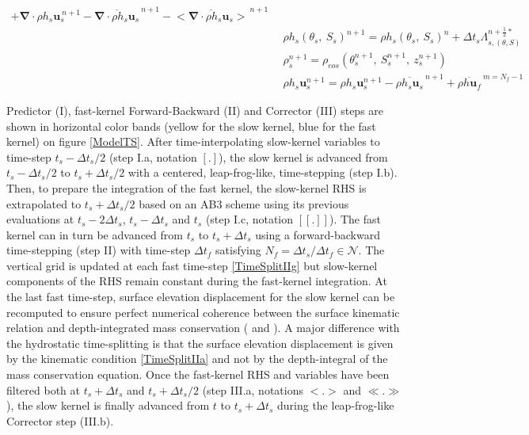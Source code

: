 \begin{table}
\begin{subequations}
\begin{alignat}{3}
 +\mathbf{\nabla}\cdot\rho h_s \mathbf{u}_s^{\ n+1}
 -\overline{\mathbf{\nabla}\cdot\rho h_s \mathbf{u}_s}^{\ n+1}
 -\overline{<\mathbf{\nabla}\cdot\rho h_s \mathbf{u}_s>}^{\ n+1}\\[2mm]
 \label{TimeSplitIIIb3}
 &\enspace\rho h_s(\theta_s,\ S_s)^{n+1}=
 \rho h_s(\theta_s,\ S_s)^{n}
 +\Delta t_s\Lambda_{s,(\theta,S)}^{n+\frac{1}{2}*}\\[0mm]
 \label{TimeSplitIIIb4}
 &\enspace\rho_s^{n+1}=\rho_{eos}\left(\theta_s^{n+1},\ S_s^{n+1},\ z_s^{n+1}\right)\\[0mm]
 \label{TimeSplitIIIb5}
 &\enspace\rho h_s\mathbf{u}_s^{n+1}=\rho h_s\mathbf{u}_s^{n+1}
 -\overline{\rho h_s\mathbf{u}_s}^{\ n+1}
 +\overline{\rho h\mathbf{u}_f}^{\ m=N_f-1}
\end{alignat}
\end{subequations}
\end{table}
Predictor (I), fast-kernel Forward-Backward (II) and Corrector (III) steps are shown in horizontal color bands (yellow for the slow kernel, blue for the fast kernel) on figure \ref{ModelTS}. After time-interpolating slow-kernel variables to time-step $t_s-\Delta t_s/2$ (step I.a, notation $[.]$), the slow kernel is advanced from $t_s-\Delta t_s/2$ to $t_s+\Delta t_s/2$ with a centered, leap-frog-like, time-stepping (step I.b). Then, to prepare the integration of the fast kernel, the slow-kernel RHS is extrapolated to $t_s+\Delta t_s/2$ based on an AB3 scheme using its previous evaluations at $t_s-2\Delta t_s$, $t_s-\Delta t_s$ and $t_s$ (step I.c, notation $[[.]]$). The fast kernel can in turn be advanced from $t_s$ to $t_s+\Delta t_s$ using a forward-backward time-stepping (step II) with time-step $\Delta t_f$ satisfying  $N_f=\Delta t_s/\Delta t_f\in\mathcal{N}$. The vertical grid is updated at each fast time-step \ref{TimeSplitIIg} but slow-kernel components of the RHS remain constant during the fast-kernel integration. At the last fast time-step, surface elevation displacement for the slow kernel can be recomputed to ensure perfect numerical coherence between the surface kinematic relation and depth-integrated mass conservation ( and ). 
A major difference with the hydrostatic time-splitting is that the surface elevation displacement is given by the kinematic condition \ref{TimeSplitIIa} and not by the depth-integral of the mass conservation equation. Once the fast-kernel RHS and variables have been filtered both at $t_s+\Delta t_s$ and $t_s+\Delta t_s/2$ (step III.a, notations $<.>$ and $\ll.\gg$), the slow kernel is finally advanced from $t$ to  $t_s+\Delta t_s$ during the leap-frog-like Corrector step (III.b).

